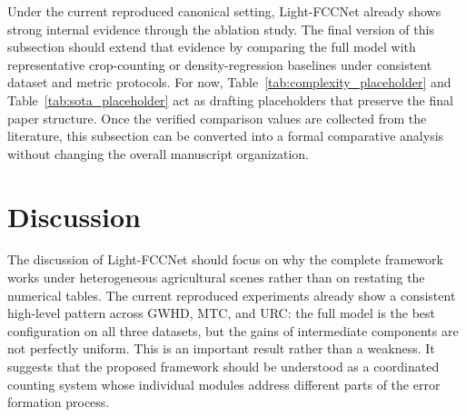\documentclass[a4paper,fleqn]{cas-sc}
\begin{document}
\begin{table}[!htbp]
    \centering
    \caption{Temporary draft placeholder for comparison with existing methods. These values are only used to preserve the paper-writing structure and must be replaced by verified literature-reported results before final submission. Lower values indicate better performance.}
    \label{tab:sota_placeholder}
\end{table}

Under the current reproduced canonical setting, Light-FCCNet already shows strong internal evidence through the ablation study. The final version of this subsection should extend that evidence by comparing the full model with representative crop-counting or density-regression baselines under consistent dataset and metric protocols. For now, Table~\ref{tab:complexity_placeholder} and Table~\ref{tab:sota_placeholder} act as drafting placeholders that preserve the final paper structure. Once the verified comparison values are collected from the literature, this subsection can be converted into a formal comparative analysis without changing the overall manuscript organization.

\section{Discussion}

The discussion of Light-FCCNet should focus on why the complete framework works under heterogeneous agricultural scenes rather than on restating the numerical tables. The current reproduced experiments already show a consistent high-level pattern across GWHD, MTC, and URC: the full model is the best configuration on all three datasets, but the gains of intermediate components are not perfectly uniform. This is an important result rather than a weakness. It suggests that the proposed framework should be understood as a coordinated counting system whose individual modules address different parts of the error formation process.
\end{document}
